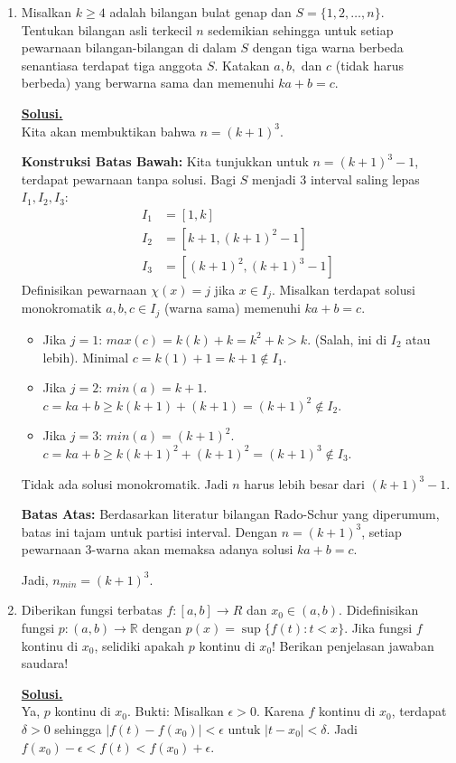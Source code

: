 \documentclass[12pt,twoside]{article}
\newenvironment{solution}
{
	\par\noindent\textbf{\underline{Solusi.}}\\
}
{
	\par
}
\begin{document}
\begin{enumerate}
  \item Misalkan $k\geq 4$ adalah bilangan bulat genap dan $S=\{1,2,\dots,n\}$.\\
        Tentukan bilangan asli terkecil $n$ sedemikian sehingga untuk setiap pewarnaan bilangan-bilangan di dalam $S$ dengan tiga warna berbeda senantiasa terdapat tiga anggota $S$. Katakan $a,b,$ dan $c$ (tidak harus berbeda) yang berwarna sama dan memenuhi $ ka+b =c.$
        \begin{solution}
          Kita akan membuktikan bahwa $n = (k+1)^3$.

          \textbf{Konstruksi Batas Bawah:}
          Kita tunjukkan untuk $n = (k+1)^3 - 1$, terdapat pewarnaan tanpa solusi.
          Bagi $S$ menjadi 3 interval saling lepas $I_1, I_2, I_3$:
          \begin{align*}
            I_1 & = [1, k]               \\
            I_2 & = [k+1, (k+1)^2-1]     \\
            I_3 & = [(k+1)^2, (k+1)^3-1]
          \end{align*}
          Definisikan pewarnaan $\chi(x) = j$ jika $x \in I_j$.
          Misalkan terdapat solusi monokromatik $a, b, c \in I_j$ (warna sama) memenuhi $ka+b=c$.
          \begin{itemize}
            \item Jika $j=1$: $max(c) = k(k)+k = k^2+k > k$. (Salah, ini di $I_2$ atau lebih). Minimal $c = k(1)+1 = k+1 \notin I_1$.
            \item Jika $j=2$: $min(a)=k+1$. $c = ka+b \ge k(k+1) + (k+1) = (k+1)^2 \notin I_2$.
            \item Jika $j=3$: $min(a)=(k+1)^2$. $c = ka+b \ge k(k+1)^2 + (k+1)^2 = (k+1)^3 \notin I_3$.
          \end{itemize}
          Tidak ada solusi monokromatik. Jadi $n$ harus lebih besar dari $(k+1)^3 - 1$.

          \textbf{Batas Atas:}
          Berdasarkan literatur bilangan Rado-Schur yang diperumum, batas ini tajam untuk partisi interval.
          Dengan $n=(k+1)^3$, setiap pewarnaan 3-warna akan memaksa adanya solusi $ka+b=c$.

          Jadi, $n_{min} = (k+1)^3$.
        \end{solution}
  \item Diberikan fungsi terbatas $f:[a,b]\rightarrow R$ dan $x_0\in (a,b) $.	Didefinisikan fungsi $p:(a,b)\rightarrow \mathbb{R}$ dengan $ p(x)=\sup\{f(t):t<x\} $. Jika fungsi $f$ kontinu di $x_0$, selidiki apakah $p$ kontinu di $x_0$! Berikan penjelasan jawaban saudara!
        \begin{solution}
          Ya, $p$ kontinu di $x_0$.
          Bukti:
          Misalkan $\epsilon > 0$. Karena $f$ kontinu di $x_0$, terdapat $\delta > 0$ sehingga $|f(t) - f(x_0)| < \epsilon$ untuk $|t-x_0| < \delta$.
          Jadi $f(x_0) - \epsilon < f(t) < f(x_0) + \epsilon$.


\end{solution}
\end{enumerate}
\end{document}
